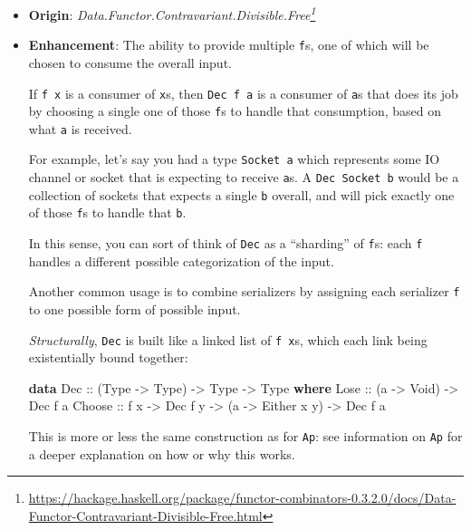 \documentclass[]{article}
\newenvironment{Shaded}{}{}
\newcommand{\DataTypeTok}[1]{\textcolor[rgb]{0.56,0.13,0.00}{#1}}
\newcommand{\KeywordTok}[1]{\textcolor[rgb]{0.00,0.44,0.13}{\textbf{#1}}}
\newcommand{\NormalTok}[1]{#1}
\newcommand{\OtherTok}[1]{\textcolor[rgb]{0.00,0.44,0.13}{#1}}
\renewcommand{\href}[2]{#2\footnote{\url{#1}}}
\begin{document}
\begin{itemize}
\item
  \textbf{Origin}:
  \emph{\href{https://hackage.haskell.org/package/functor-combinators-0.3.2.0/docs/Data-Functor-Contravariant-Divisible-Free.html}{Data.Functor.Contravariant.Divisible.Free}}
\item
  \textbf{Enhancement}: The ability to provide multiple \texttt{f}s, one of
  which will be chosen to consume the overall input.

  If \texttt{f\ x} is a consumer of \texttt{x}s, then \texttt{Dec\ f\ a} is a
  consumer of \texttt{a}s that does its job by choosing a single one of those
  \texttt{f}s to handle that consumption, based on what \texttt{a} is received.

  For example, let's say you had a type \texttt{Socket\ a} which represents some
  IO channel or socket that is expecting to receive \texttt{a}s. A
  \texttt{Dec\ Socket\ b} would be a collection of sockets that expects a single
  \texttt{b} overall, and will pick exactly one of those \texttt{f}s to handle
  that \texttt{b}.

  In this sense, you can sort of think of \texttt{Dec} as a ``sharding'' of
  \texttt{f}s: each \texttt{f} handles a different possible categorization of
  the input.

  Another common usage is to combine serializers by assigning each serializer
  \texttt{f} to one possible form of possible input.

  \emph{Structurally}, \texttt{Dec} is built like a linked list of
  \texttt{f\ x}s, which each link being existentially bound together:

\begin{Shaded}
\begin{Highlighting}[]
\KeywordTok{data} \DataTypeTok{Dec}\OtherTok{ ::}\NormalTok{ (}\DataTypeTok{Type} \OtherTok{{-}>} \DataTypeTok{Type}\NormalTok{) }\OtherTok{{-}>} \DataTypeTok{Type} \OtherTok{{-}>} \DataTypeTok{Type} \KeywordTok{where}
    \DataTypeTok{Lose}\OtherTok{   ::}\NormalTok{ (a }\OtherTok{{-}>} \DataTypeTok{Void}\NormalTok{) }\OtherTok{{-}>} \DataTypeTok{Dec}\NormalTok{ f a}
    \DataTypeTok{Choose}\OtherTok{ ::}\NormalTok{ f x }\OtherTok{{-}>} \DataTypeTok{Dec}\NormalTok{ f y }\OtherTok{{-}>}\NormalTok{ (a }\OtherTok{{-}>} \DataTypeTok{Either}\NormalTok{ x y) }\OtherTok{{-}>} \DataTypeTok{Dec}\NormalTok{ f a}
\end{Highlighting}
\end{Shaded}

  This is more or less the same construction as for \texttt{Ap}: see information
  on \texttt{Ap} for a deeper explanation on how or why this works.


\end{itemize}
\end{document}
